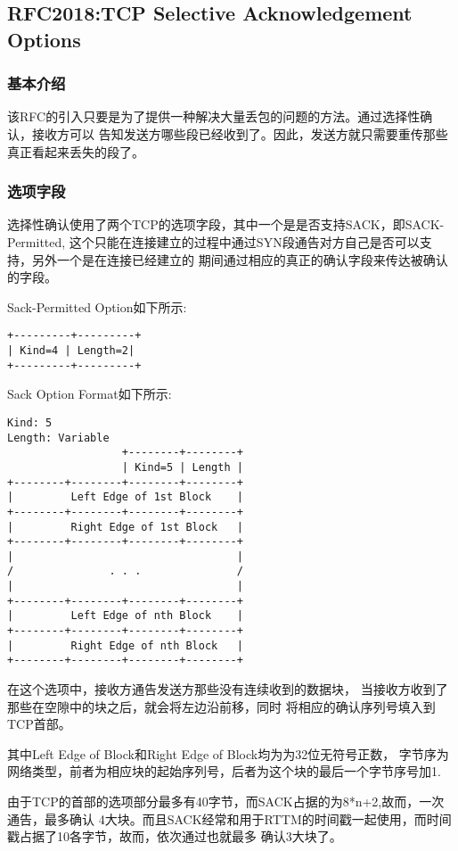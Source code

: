 	\subsection{RFC2018:TCP Selective Acknowledgement Options}

		\subsubsection{基本介绍}
			该RFC的引入只要是为了提供一种解决大量丢包的问题的方法。通过选择性确认，接收方可以
		告知发送方哪些段已经收到了。因此，发送方就只需要重传那些真正看起来丢失的段了。
		\subsubsection{选项字段}
			选择性确认使用了两个TCP的选项字段，其中一个是是否支持SACK，即SACK-Permitted,
		这个只能在连接建立的过程中通过SYN段通告对方自己是否可以支持，另外一个是在连接已经建立的
		期间通过相应的真正的确认字段来传达被确认的字段。
		
			Sack-Permitted Option如下所示:
\begin{verbatim}
+---------+---------+
| Kind=4 | Length=2|
+---------+---------+
\end{verbatim}

			Sack Option Format如下所示:
\begin{verbatim}
Kind: 5
Length: Variable
				  +--------+--------+
				  | Kind=5 | Length |
+--------+--------+--------+--------+
|         Left Edge of 1st Block    |
+--------+--------+--------+--------+
|         Right Edge of 1st Block   |
+--------+--------+--------+--------+
|                                   |
/               . . .               /
|                                   |
+--------+--------+--------+--------+
|         Left Edge of nth Block    |
+--------+--------+--------+--------+
|         Right Edge of nth Block   |
+--------+--------+--------+--------+
\end{verbatim}

			在这个选项中，接收方通告发送方那些没有连续收到的数据块，
			当接收方收到了那些在空隙中的块之后，就会将左边沿前移，同时
			将相应的确认序列号填入到TCP首部。

			其中Left Edge of Block和Right Edge of Block均为为32位无符号正数，
			字节序为网络类型，前者为相应块的起始序列号，后者为这个块的最后一个字节序号加1.

			由于TCP的首部的选项部分最多有40字节，而SACK占据的为8*n+2,故而，一次通告，最多确认
			4大块。而且SACK经常和用于RTTM的时间戳一起使用，而时间戳占据了10各字节，故而，依次通过也就最多
			确认3大块了。

